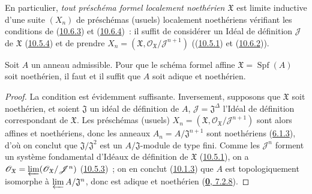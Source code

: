 En particulier, \emph{tout préschéma formel localement noethérien
$\mathfrak{X}$} est limite inductive d'une suite $(X_n)$ de préschémas
(usuels) localement noethériens vérifiant les conditions de
(\hyperref[I.10.6.3-fr]{10.6.3}) et
(\hyperref[I.10.6.4-fr]{10.6.4})~: il suffit de considérer un Idéal de
définition $\mathscr{J}$ de $\mathfrak{X}$
(\hyperref[I.10.5.4-fr]{10.5.4}) et de prendre
$X_n=(\mathfrak{X},
\mathscr{O}_{\mathfrak{X}}/\mathscr{J}^{n+1})$
((\hyperref[I.10.5.1-fr]{10.5.1}) et
(\hyperref[I.10.6.2-fr]{10.6.2})).

\begin{corollary}[10.6.5]
\label{I.10.6.5-fr}
Soit $A$ un anneau admissible. Pour que le schéma formel affine
$\mathfrak{X}=\operatorname{Spf}(A)$ soit noethérien, il faut et il
suffit que $A$ soit adique et noethérien.
\end{corollary}

\begin{proof}
La condition est évidemment suffisante. Inversement, supposons que
$\mathfrak{X}$ soit noethérien, et soient $\mathfrak{J}$ un idéal de
définition de $A$, $\mathscr{J}=\mathfrak{J}^\Delta$ l'Idéal de
définition correspondant de $\mathfrak{X}$. Les préschémas (usuels)
$X_n=(\mathfrak{X},
\mathscr{O}_{\mathfrak{X}}/\mathscr{J}^{n+1})$ sont alors affines et
noethériens, donc les anneaux
$A_n=A/\mathfrak{J}^{n+1}$ sont noethériens
(\hyperref[I.6.1.3-fr]{6.1.3}), d'où on conclut que
$\mathfrak{J}/\mathfrak{J}^2$ est un $A/\mathfrak{J}$-module de type
fini. Comme les $\mathscr{J}^n$ forment un système fondamental d'Idéaux
de définition de $\mathfrak{X}$
(\hyperref[I.10.5.1-fr]{10.5.1}), on a
$\mathscr{O}_{\mathfrak{X}}
=\varprojlim(\mathscr{O}_{\mathfrak{X}}/\mathscr{J}^n)$
(\hyperref[I.10.5.3-fr]{10.5.3})~; on en conclut
(\hyperref[I.10.1.3-fr]{10.1.3}) que $A$ est topologiquement isomorphe à
$\varprojlim A/\mathfrak{J}^n$, donc est adique et noethérien
(\hyperref[0.7.2.8-fr]{\textbf{0}, 7.2.8}).
\end{proof}

